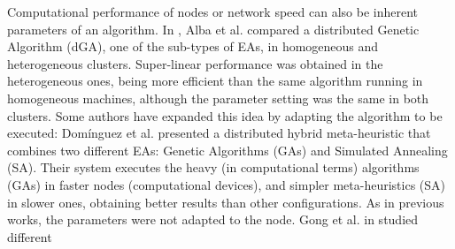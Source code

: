 \documentclass[final,1p,times]{elsarticle}
\begin{document}
 Computational performance of nodes or network speed can also be
 inherent parameters of an algorithm. In \cite{HETEROGENEOUSHARD},
 Alba et al. compared a distributed Genetic Algorithm (dGA), one of
 the sub-types of EAs, in homogeneous and heterogeneous clusters. %
 Super-linear performance was obtained in the heterogeneous ones,
 being more efficient than the same algorithm running in homogeneous
 machines, although the parameter setting was the same in both
 clusters. %
% 
Some authors have expanded this idea %
by adapting the algorithm to be executed: Dom\'inguez et
al. \cite{HYDROCM} presented a distributed hybrid meta-heuristic that
combines two different EAs: Genetic Algorithms (GAs) and Simulated
Annealing (SA). Their system executes the heavy (in computational
terms) algorithms (GAs) in faster nodes (computational devices), and
simpler meta-heuristics (SA) in slower ones, obtaining better results
than other configurations. As in previous works, the parameters were
not adapted to the node. %
 Gong et al. in \cite{HETEROGENEOUSTOPOLOGY} studied different
\end{document}
